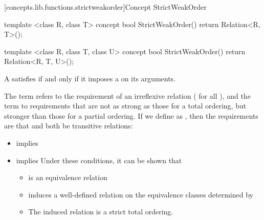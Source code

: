 \begin{addedblock}
[concepts.lib.functions.strictweakorder]{Concept StrictWeakOrder}

%
\begin{itemdecl}
template <class R, class T>
concept bool StrictWeakOrder() {
  return Relation<R, T>();
}

template <class R, class T, class U>
concept bool StrictWeakOrder() {
  return Relation<R, T, U>();
}
\end{itemdecl}

\begin{itemdescr}
\pnum
A  satisfies  if and only if
it imposes a  on its arguments.


{\color{black}
\pnum
The term
refers to the
requirement of an irreflexive relation ( for all ),
and the term
to requirements that are not as strong as
those for a total ordering,
but stronger than those for a partial
ordering.
If we define
as
,
then the requirements are that
and
both be transitive  relations:

\begin{itemize}
\item
{}
implies
\item
{}
implies
\enternote
Under these conditions, it can be shown that
\begin{itemize}
\item
{}
is an equivalence relation
\item
{}
induces a well-defined relation on the equivalence
classes determined by
\item
The induced relation is a strict total ordering.
\exitnote
\end{itemize}
\end{itemize}
}
\end{itemdescr}
\end{addedblock}
